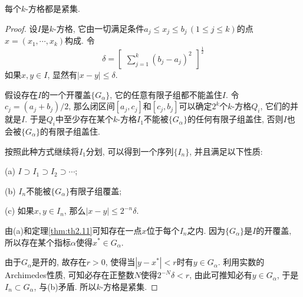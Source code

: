 \documentclass[cn,12pt,math=mtpro2,citestyle=gb7714-2015,bibstyle=gb7714-2015,twocol]{elegantbook}
\newcommand{\bx}{x}
\begin{document}
\begin{theorem}\label{thm:th2.12}
  每个$k$-方格都是紧集.
\end{theorem}
\begin{proof}
  设$I$是$k$-方格, 它由一切满足条件$a_j\leq x_j\leq b_j\,(1\leq j \leq k)$的点$x=(x_1,\cdots,x_k)$构成. 令
  $$\delta=\begin{bmatrix}
\displaystyle\sum_{j=1}^{k}(b_j-a_j)^2
\end{bmatrix}^{\frac{1}{2}} $$
  如果$x, y \in I$, 显然有$|x-y |\leq \delta$.

  假设存在$I$的一个开覆盖$\{G_\alpha\}$, 它的任意有限子组都不能盖住$I$. 令$c_j=(a_j+b_j)/2$, 那么闭区间$[a_j,c_j]$和$[c_j,b_j]$可以确定$2^k$个$k$-方格$Q_i$, 它们的并就是$I$. 于是$Q_i$中至少存在某个$k$-方格$I_1$不能被$\{G_\alpha\}$的任何有限子组盖住, 否则$I$也会被$\{G_\alpha\}$的有限子组盖住.

  按照此种方式继续将$I_1$分划, 可以得到一个序列$\{I_n\}$, 并且满足以下性质:

  (a) $I\supset I_1\supset I_2\supset \cdots$;

  (b) $I_n$不能被$\{G_\alpha\}$有限子组覆盖;

  (c) 如果$x,y \in I_n$, 那么$|x-y |\leq 2^{-n}\delta$.

  \noindent 由(a)和定理\ref{thm:th2.11}可知存在一点$\bx$位于每个$I_n$之内. 因为$\{G_\alpha\}$是$I$的开覆盖, 所以存在某个指标$\alpha$使得$x^\ast\in G_\alpha$.

  由于$G_\alpha$是开的, 故存在$r>0$, 使得当$|y-x^\ast|<r$时有$y \in G_\alpha$. 利用实数的Archimedes性质, 可知必存在正整数$N$使得$2^{-N}\delta<r$, 由此可推知必有$y \in G_\alpha$, 于是$I_n\subset G_\alpha$, 与(b)矛盾. 所以$k$-方格是紧集.

\end{proof}
\end{document}
